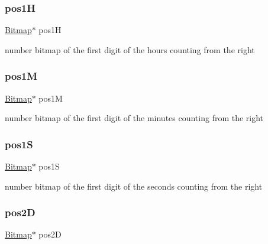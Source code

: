 \mbox{\label{struct_countdown_a34e0e880818ee4a4a94a6be9948adb55}} 
\subsubsection{\texorpdfstring{pos1H}{pos1H}}
{\footnotesize\ttfamily \hyperlink{struct_bitmap}{Bitmap}$\ast$ pos1H}



number bitmap of the first digit of the hours counting from the right 

\mbox{\label{struct_countdown_a8ade0ba6666bd6084af2448eb493f773}} 
\subsubsection{\texorpdfstring{pos1M}{pos1M}}
{\footnotesize\ttfamily \hyperlink{struct_bitmap}{Bitmap}$\ast$ pos1M}



number bitmap of the first digit of the minutes counting from the right 

\mbox{\label{struct_countdown_a12a5b7122e87d4bf2674d44ccf76668b}} 
\subsubsection{\texorpdfstring{pos1S}{pos1S}}
{\footnotesize\ttfamily \hyperlink{struct_bitmap}{Bitmap}$\ast$ pos1S}



number bitmap of the first digit of the seconds counting from the right 

\mbox{\label{struct_countdown_a3ece20d4a7a7bc9b6fa79ef0cdf378b3}} 
\subsubsection{\texorpdfstring{pos2D}{pos2D}}
{\footnotesize\ttfamily \hyperlink{struct_bitmap}{Bitmap}$\ast$ pos2D}



